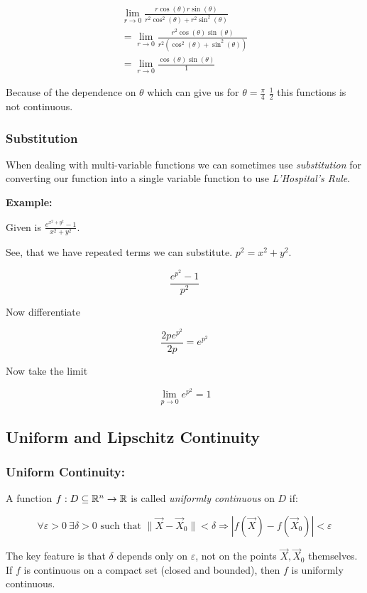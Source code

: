 \begin{align*}
    \lim_{r \to 0} \frac{r\cos(\theta)r\sin(\theta)}{r^2\cos^2(\theta) + r^2\sin^2(\theta)}\\
    = \lim_{r \to 0} \frac{r^2\cos(\theta)\sin(\theta)}{r^2(\cos^2(\theta) + \sin^2(\theta))}\\
    = \lim_{r \to 0} \frac{\cos(\theta)\sin(\theta)}{1}
\end{align*}

Because of the dependence on \(\theta\) which can give us for \(\theta = \frac{\pi}{4}\) \(\frac{1}{2}\) 
this functions is not continuous.

\subsubsection{Substitution}

When dealing with multi-variable functions we can sometimes use \emph{substitution} 
for converting our function into a single variable function to use \emph{L'Hospital's Rule}.

\textbf{Example:}

Given is \(\frac{e^{x^2 + y^2} - 1}{x^2 + y^2}\).

See, that we have repeated terms we can substitute. \(p^2 = x^2 + y^2\).

\[
    \frac{e^{p^2} - 1}{p^2}
\]

Now differentiate

\[
    \frac{2p e^{p^2} }{2p} = e^{p^2}
\]

Now take the limit

\[
    \lim_{p \to 0} e^{p^2} = 1
\]

\subsection{Uniform and Lipschitz Continuity}

\subsubsection{Uniform Continuity:}  
A function \( f : D \subseteq \mathbb{R}^n \to \mathbb{R} \) is called \emph{uniformly continuous} on 
\( D \) if:

\[
    \forall \varepsilon > 0 \ \exists \delta > 0 \text{ such that } \|\vec{X} - \vec{X}_0\| < \delta 
    \Rightarrow |f(\vec{X}) - f(\vec{X}_0)| < \varepsilon
\]

The key feature is that \( \delta \) depends only on \( \varepsilon \), not on the points 
\( \vec{X}, \vec{X}_0 \) themselves.  
If \(f\) is continuous on a compact set (closed and bounded), then \(f\) is uniformly continuous.

